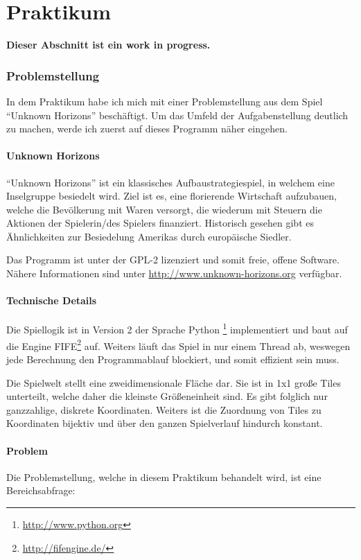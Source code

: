 \documentclass[%
			paper=a4,%
			DIV12,
			liststotoc,
			bibtotoc,
			draft=false,%
			titlepage
			]{scrartcl}
\begin{document}
\newpage
\part{Praktikum}

{\Huge \bf Dieser Abschnitt ist ein work in progress.}
\newpage

\section{Problemstellung}

In dem Praktikum habe ich mich mit einer Problemstellung aus dem Spiel "`Unknown Horizons"' beschäftigt.
Um das Umfeld der Aufgabenstellung deutlich zu machen, werde ich zuerst auf dieses Programm näher eingehen.

\subsection{Unknown Horizons}
"`Unknown Horizons"' ist ein klassisches Aufbaustrategiespiel, in welchem eine Inselgruppe besiedelt wird. 
Ziel ist es, eine florierende Wirtschaft aufzubauen, welche die Bevölkerung mit Waren versorgt, die wiederum mit Steuern die Aktionen der Spielerin/des Spielers finanziert.
Historisch gesehen gibt es Ähnlichkeiten zur Besiedelung Amerikas durch europäische Siedler.

Das Programm ist unter der GPL-2 lizenziert und somit freie, offene Software. Nähere Informationen sind unter \url{http://www.unknown-horizons.org} verfügbar.

\subsection{Technische Details}

Die Spiellogik ist in Version 2 der Sprache Python \footnote{\url{http://www.python.org}} implementiert und
baut auf die Engine FIFE\footnote{\url{http://fifengine.de/}} auf.
Weiters läuft das Spiel in nur einem Thread ab, weswegen jede Berechnung den Programmablauf blockiert, und somit effizient sein muss.

Die Spielwelt stellt eine zweidimensionale Fläche dar.
Sie ist in 1x1 große Tiles unterteilt, welche daher die kleinste Größeneinheit sind. 
Es gibt folglich nur ganzzahlige, diskrete Koordinaten.
Weiters ist die Zuordnung von Tiles zu Koordinaten bijektiv und über den ganzen Spielverlauf hindurch konstant.

\subsection{Problem}
Die Problemstellung, welche in diesem Praktikum behandelt wird, ist eine Bereichsabfrage:
\end{document}
